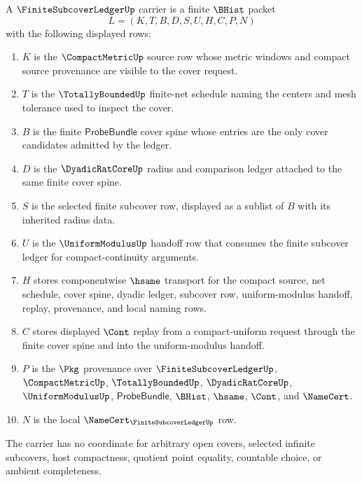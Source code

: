 \begin{definition}
\label{def:finite-subcover-ledger-carrier}
A $\FiniteSubcoverLedgerUp$ carrier is a finite $\BHist$ packet
$$
L=(K,T,B,D,S,U,H,C,P,N)
$$
with the following displayed rows:
\begin{enumerate}
\item $K$ is the $\CompactMetricUp$ source row whose metric windows and compact source provenance are visible to the cover request.
\item $T$ is the $\TotallyBoundedUp$ finite-net schedule naming the centers and mesh tolerance used to inspect the cover.
\item $B$ is the finite $\mathsf{ProbeBundle}$ cover spine whose entries are the only cover candidates admitted by the ledger.
\item $D$ is the $\DyadicRatCoreUp$ radius and comparison ledger attached to the same finite cover spine.
\item $S$ is the selected finite subcover row, displayed as a sublist of $B$ with its inherited radius data.
\item $U$ is the $\UniformModulusUp$ handoff row that consumes the finite subcover ledger for compact-continuity arguments.
\item $H$ stores componentwise $\hsame$ transport for the compact source, net schedule, cover spine, dyadic ledger, subcover row, uniform-modulus handoff, replay, provenance, and local naming rows.
\item $C$ stores displayed $\Cont$ replay from a compact-uniform request through the finite cover spine and into the uniform-modulus handoff.
\item $P$ is the $\Pkg$ provenance over $\FiniteSubcoverLedgerUp$, $\CompactMetricUp$, $\TotallyBoundedUp$, $\DyadicRatCoreUp$, $\UniformModulusUp$, $\mathsf{ProbeBundle}$, $\BHist$, $\hsame$, $\Cont$, and $\NameCert$.
\item $N$ is the local $\NameCert_{\FiniteSubcoverLedgerUp}$ row.
\end{enumerate}
The carrier has no coordinate for arbitrary open covers, selected infinite subcovers, host compactness, quotient point equality, countable choice, or ambient completeness.
\end{definition}

